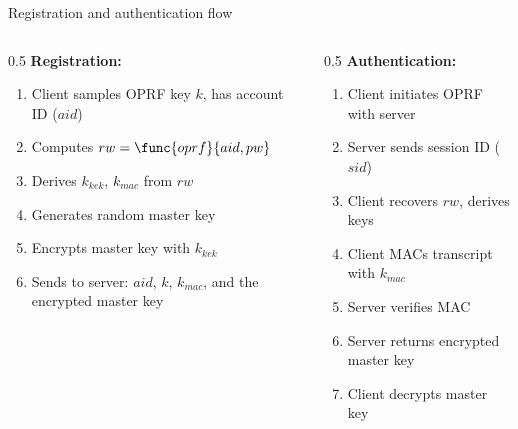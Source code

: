 \ifdefined\PRESENTATION\else\PassOptionsToClass{handout}{beamer}\fi\documentclass[aspectratio=169, lualatex]{beamer}
\begin{document}
\begin{frame}{Registration and authentication flow}
	\begin{columns}[c]
		\begin{column}{0.5\textwidth}
			\textbf{Registration:}
			\begin{enumerate}
				\item Client samples OPRF key $k$, has account ID ($aid$)
				\item Computes $rw = \func{oprf}{aid, pw}$
				\item Derives $k_{kek}$, $k_{mac}$ from $rw$
				\item Generates random master key
				\item Encrypts master key with $k_{kek}$
				\item Sends to server: $aid$, $k$, $k_{mac}$, and the encrypted master key
			\end{enumerate}
		\end{column}
		\begin{column}{0.5\textwidth}
			\textbf{Authentication:}
			\begin{enumerate}
				\item Client initiates OPRF with server
				\item Server sends session ID ($sid$)
				\item Client recovers $rw$, derives keys
				\item Client MACs transcript with $k_{mac}$
				\item Server verifies MAC
				\item Server returns encrypted master key
				\item Client decrypts master key
			\end{enumerate}
		\end{column}
	\end{columns}
\end{frame}
\end{document}
